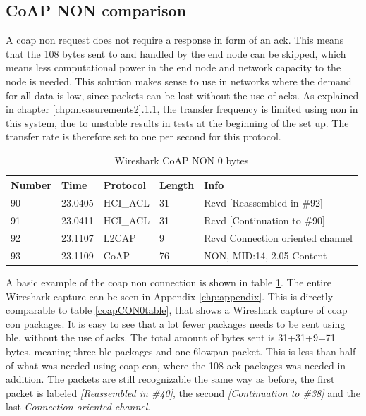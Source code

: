 \subsection{CoAP NON comparison}

A \gls{coap} \gls{non} request does not require a response in form of an \gls{ack}. This means that the 108 bytes sent to and handled by the end node can be skipped, which means less computational power in the end node and network capacity to the node is needed. This solution makes sense to use in networks where the demand for all data is low, since packets can be lost without the use of \glspl{ack}. As explained in chapter \ref{chp:measurements2}.1.1, the transfer frequency is limited using \gls{non} in this system, due to unstable results in tests at the beginning of the set up. The transfer rate is therefore set to one per second for this protocol. 


\begin{table}[ht]
\centering
\caption{Wireshark CoAP NON 0 bytes}
\label{coapNON0table}
\begin{tabular}{lllll}
\hline
Number & Time    & Protocol & Length & Info                             \\ \hline
90     & 23.0405 & HCI\_ACL & 31     & Rcvd {[}Reassembled in \#92{]}   \\
91     & 23.0411 & HCI\_ACL & 31     & Rcvd {[}Continuation to \#90{]}  \\
92     & 23.1107 & L2CAP    & 9      & Rcvd Connection oriented channel \\
93     & 23.1109 & CoAP     & 76     & NON, MID:14, 2.05 Content        \\ \hline
\end{tabular}
\end{table}


A basic example of the \gls{coap} \gls{non} connection is shown in table \ref{coapNON0table}. The entire Wireshark capture can be seen in Appendix \ref{chp:appendix}. This is directly comparable to table \ref{coapCON0table}, that shows a Wireshark capture of \gls{coap} \gls{con} packages. It is easy to see that a lot fewer packages needs to be sent using \gls{ble}, without the use of \glspl{ack}. The total amount of bytes sent is 31+31+9=71 bytes, meaning three \gls{ble} packages and one \gls{6lowpan} packet. This is less than half of what was needed using \gls{coap} \gls{con}, where the 108 \gls{ack} packages was needed in addition. The packets are still recognizable the same way as before, the first packet is labeled \textit{[Reassembled in \#40]}, the second \textit{[Continuation to \#38]} and the last \textit{Connection oriented channel}.

